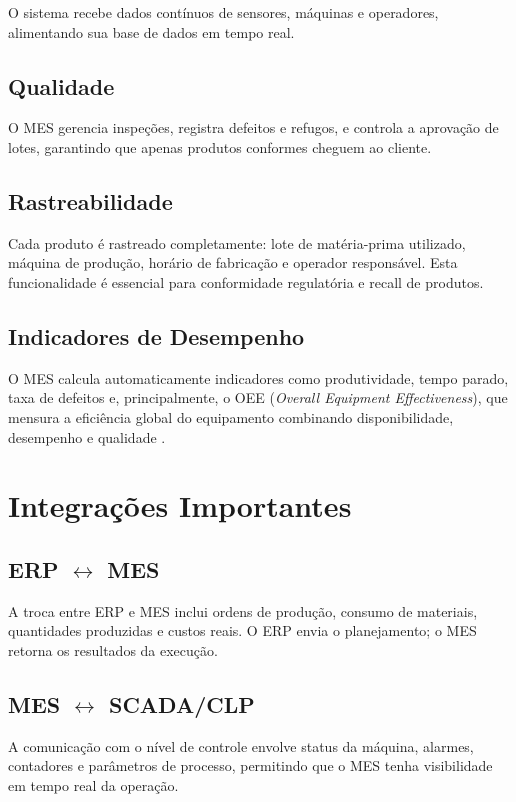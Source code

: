 \documentclass[12pt,a4paper,oneside]{article}
\begin{document}
O sistema recebe dados contínuos de sensores, máquinas e operadores, alimentando sua base de dados em tempo real.

\subsection{Qualidade}

O MES gerencia inspeções, registra defeitos e refugos, e controla a aprovação de lotes, garantindo que apenas produtos conformes cheguem ao cliente.

\subsection{Rastreabilidade}

Cada produto é rastreado completamente: lote de matéria-prima utilizado, máquina de produção, horário de fabricação e operador responsável. Esta funcionalidade é essencial para conformidade regulatória e recall de produtos.

\subsection{Indicadores de Desempenho}

O MES calcula automaticamente indicadores como produtividade, tempo parado, taxa de defeitos e, principalmente, o OEE (\textit{Overall Equipment Effectiveness}), que mensura a eficiência global do equipamento combinando disponibilidade, desempenho e qualidade \cite{cardoso2021}.

\section{Integrações Importantes}

\subsection{ERP $\leftrightarrow$ MES}

A troca entre ERP e MES inclui ordens de produção, consumo de materiais, quantidades produzidas e custos reais. O ERP envia o planejamento; o MES retorna os resultados da execução.

\subsection{MES $\leftrightarrow$ SCADA/CLP}

A comunicação com o nível de controle envolve status da máquina, alarmes, contadores e parâmetros de processo, permitindo que o MES tenha visibilidade em tempo real da operação.
\end{document}
